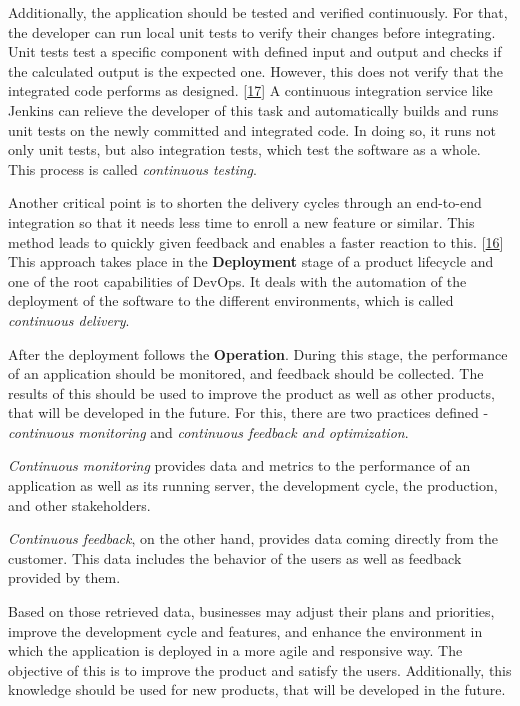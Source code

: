\documentclass[12pt,english,a4paper,oneside,,tablecaptionabove]{scrbook}
\begin{document}
Additionally, the application should be tested and verified
continuously. For that, the developer can run local unit tests to verify
their changes before integrating. Unit tests test a specific component
with defined input and output and checks if the calculated output is the
expected one. However, this does not verify that the integrated code
performs as designed.
{[}\protect\hyperlink{ref-AmazonDocumentation}{17}{]} A continuous
integration service like Jenkins can relieve the developer of this task
and automatically builds and runs unit tests on the newly committed and
integrated code. In doing so, it runs not only unit tests, but also
integration tests, which test the software as a whole. This process is
called \emph{continuous testing}.

Another critical point is to shorten the delivery cycles through an
end-to-end integration so that it needs less time to enroll a new
feature or similar. This method leads to quickly given feedback and
enables a faster reaction to this.
{[}\protect\hyperlink{ref-IBM2013}{16}{]} This approach takes place in
the \textbf{Deployment} stage of a product lifecycle and one of the root
capabilities of DevOps. It deals with the automation of the deployment
of the software to the different environments, which is called
\emph{continuous delivery}.

After the deployment follows the \textbf{Operation}. During this stage,
the performance of an application should be monitored, and feedback
should be collected. The results of this should be used to improve the
product as well as other products, that will be developed in the future.
For this, there are two practices defined - \emph{continuous monitoring}
and \emph{continuous feedback and optimization}.

\emph{Continuous monitoring} provides data and metrics to the
performance of an application as well as its running server, the
development cycle, the production, and other stakeholders.

\emph{Continuous feedback}, on the other hand, provides data coming
directly from the customer. This data includes the behavior of the users
as well as feedback provided by them.

Based on those retrieved data, businesses may adjust their plans and
priorities, improve the development cycle and features, and enhance the
environment in which the application is deployed in a more agile and
responsive way. The objective of this is to improve the product and
satisfy the users. Additionally, this knowledge should be used for new
products, that will be developed in the future.
\end{document}
